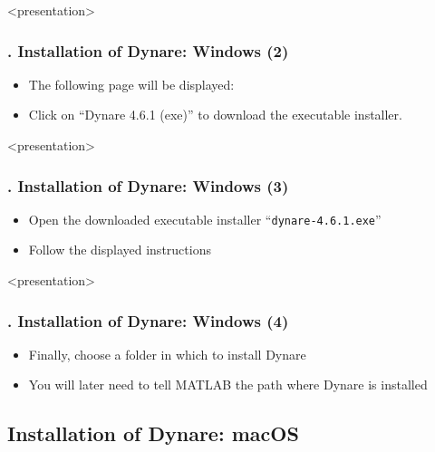 \documentclass[11pt,aspectratio=169]{beamer}
\begin{document}
\begin{frame}<presentation>
	\frametitle{{\thesection.\thesubsection} Installation of Dynare: Windows (2)}
	\begin{itemize}
		\item The following page will be displayed:
		\begin{figure}
		\end{figure}
	\item Click on ``Dynare 4.6.1 (exe)'' to download the executable installer.
	\end{itemize}
\end{frame}
\begin{frame}<presentation>
	\frametitle{{\thesection.\thesubsection} Installation of Dynare: Windows (3)}
	\begin{itemize}
		\item Open the downloaded executable installer ``\texttt{dynare-4.6.1.exe}''
		\item Follow the displayed instructions
		\begin{figure}
		\end{figure}

	\end{itemize}
\end{frame}


\begin{frame}<presentation>
	\frametitle{{\thesection.\thesubsection} Installation of Dynare: Windows (4)}
	\begin{itemize}
		\item Finally, choose a folder in which to install Dynare
		
		\begin{figure}
		\end{figure}
			\item You will later need to tell MATLAB the path where Dynare is installed
	\end{itemize}
\end{frame}

\subsection{Installation of Dynare: macOS}
\end{document}
